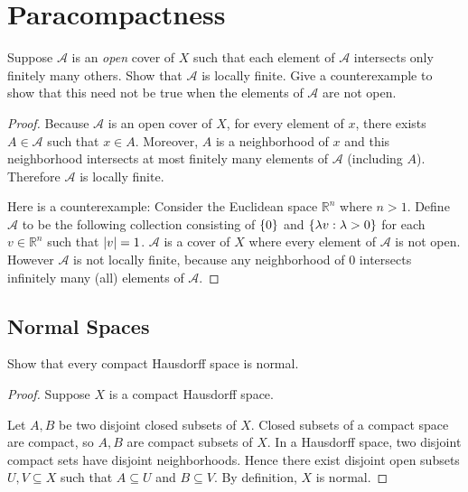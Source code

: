 \section*{Paracompactness}

\begin{exercise}{4.73}
	Suppose $\mathscr{A}$ is an \textit{open} cover of $X$ such that each element of $\mathscr{A}$ intersects only finitely many others. Show that $\mathscr{A}$ is locally finite. Give a counterexample to show that this need not be true when the elements of $\mathscr{A}$ are not open.
\end{exercise}

\begin{proof}
	Because $\mathscr{A}$ is an open cover of $X$, for every element of $x$, there exists $A\in\mathscr{A}$ such that $x\in A$. Moreover, $A$ is a neighborhood of $x$ and this neighborhood intersects at most finitely many elements of $\mathscr{A}$ (including $A$). Therefore $\mathscr{A}$ is locally finite.

	Here is a counterexample: Consider the Euclidean space $\mathbb{R}^{n}$ where $n > 1$. Define $\mathscr{A}$ to be the following collection consisting of $\left\{{0}\right\}$ and $\left\{{ \lambda v : \lambda > 0 }\right\}$ for each $v\in \mathbb{R}^{n}$ such that $\left\vert{v}\right\vert = 1$. $\mathscr{A}$ is a cover of $X$ where every element of $\mathscr{A}$ is not open. However $\mathscr{A}$ is not locally finite, because any neighborhood of $0$ intersects infinitely many (all) elements of $\mathscr{A}$.
\end{proof}

\subsection*{Normal Spaces}

\begin{exercise}{4.78}
	Show that every compact Hausdorff space is normal.
\end{exercise}

\begin{proof}
	Suppose $X$ is a compact Hausdorff space.

	Let $A, B$ be two disjoint closed subsets of $X$. Closed subsets of a compact space are compact, so $A, B$ are compact subsets of $X$. In a Hausdorff space, two disjoint compact sets have disjoint neighborhoods. Hence there exist disjoint open subsets $U, V\subseteq X$ such that $A\subseteq U$ and $B\subseteq V$. By definition, $X$ is normal.
\end{proof}

